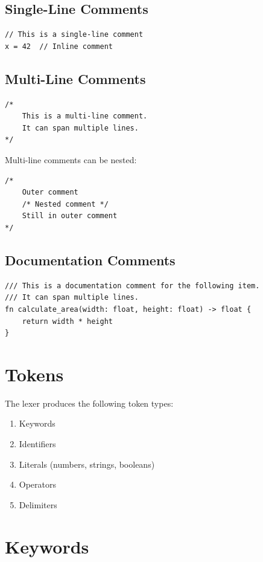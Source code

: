 \subsection{Single-Line Comments}

\begin{lstlisting}
// This is a single-line comment
x = 42  // Inline comment
\end{lstlisting}

\subsection{Multi-Line Comments}

\begin{lstlisting}
/*
    This is a multi-line comment.
    It can span multiple lines.
*/
\end{lstlisting}

Multi-line comments can be nested:

\begin{lstlisting}
/*
    Outer comment
    /* Nested comment */
    Still in outer comment
*/
\end{lstlisting}

\subsection{Documentation Comments}

\begin{lstlisting}
/// This is a documentation comment for the following item.
/// It can span multiple lines.
fn calculate_area(width: float, height: float) -> float {
    return width * height
}
\end{lstlisting}

\section{Tokens}

The lexer produces the following token types:

\begin{enumerate}
    \item Keywords
    \item Identifiers
    \item Literals (numbers, strings, booleans)
    \item Operators
    \item Delimiters
\end{enumerate}

\section{Keywords}

